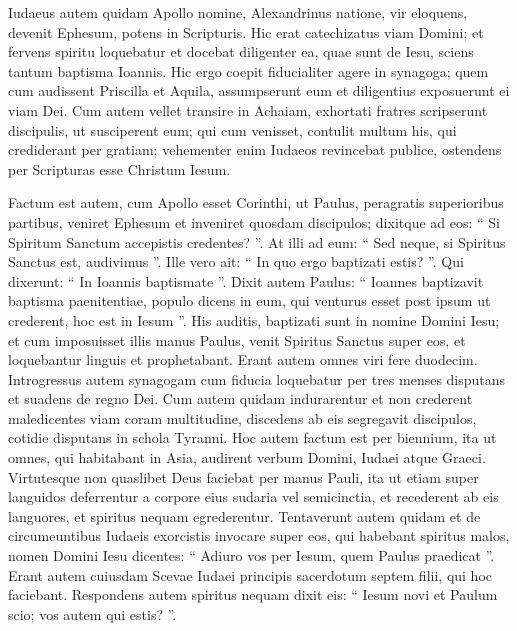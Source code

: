 \begin{biblechapter}
\begin{biblechapter}
\begin{biblechapter}
\begin{biblechapter}
\begin{biblechapter}
\begin{biblechapter}
\begin{biblechapter}
\begin{biblechapter}
\begin{biblechapter}
\begin{biblechapter}
\begin{biblechapter}
\begin{biblechapter}
\begin{biblechapter}
\begin{biblechapter}
\begin{biblechapter}
\begin{biblechapter}
\begin{biblechapter}
\begin{biblechapter}
 \verse Iudaeus autem quidam Apollo nomine, Alexandrinus natione, vir eloquens, devenit Ephesum, potens in Scripturis. 
\verse Hic erat catechizatus viam Domini; et fervens spiritu loquebatur et docebat diligenter ea, quae sunt de Iesu, sciens tantum baptisma Ioannis. 
\verse Hic ergo coepit fiducialiter agere in synagoga; quem cum audissent Priscilla et Aquila, assumpserunt eum et diligentius exposuerunt ei viam Dei. 
\verse Cum autem vellet transire in Achaiam, exhortati fratres scripserunt discipulis, ut susciperent eum; qui cum venisset, contulit multum his, qui crediderant per gratiam; 
\verse vehementer enim Iudaeos revincebat publice, ostendens per Scripturas esse Christum Iesum.
 
\begin{biblechapter}
\verse Factum est autem, cum Apollo esset Corinthi, ut Paulus, peragratis superioribus partibus, veniret Ephesum et inveniret quosdam discipulos; 
\verse dixitque ad eos: “ Si Spiritum Sanctum accepistis credentes? ”. At illi ad eum: “ Sed neque, si Spiritus Sanctus est, audivimus ”. 
\verse Ille vero ait: “ In quo ergo baptizati estis? ”. Qui dixerunt: “ In Ioannis baptismate ”. 
\verse Dixit autem Paulus: “ Ioannes baptizavit baptisma paenitentiae, populo dicens in eum, qui venturus esset post ipsum ut crederent, hoc est in Iesum ”. 
\verse His auditis, baptizati sunt in nomine Domini Iesu; 
\verse et cum imposuisset illis manus Paulus, venit Spiritus Sanctus super eos, et loquebantur linguis et prophetabant. 
\verse Erant autem omnes viri fere duodecim.
 \verse Introgressus autem synagogam cum fiducia loquebatur per tres menses disputans et suadens de regno Dei. 
\verse Cum autem quidam indurarentur et non crederent maledicentes viam coram multitudine, discedens ab eis segregavit discipulos, cotidie disputans in schola Tyranni. 
\verse Hoc autem factum est per biennium, ita ut omnes, qui habitabant in Asia, audirent verbum Domini, Iudaei atque Graeci.
 \verse Virtutesque non quaslibet Deus faciebat per manus Pauli, 
\verse ita ut etiam super languidos deferrentur a corpore eius sudaria vel semicinctia, et recederent ab eis languores, et spiritus nequam egrederentur.
 \verse Tentaverunt autem quidam et de circumeuntibus Iudaeis exorcistis invocare super eos, qui habebant spiritus malos, nomen Domini Iesu dicentes: “ Adiuro vos per Iesum, quem Paulus praedicat ”. 
\verse Erant autem cuiusdam Scevae Iudaei principis sacerdotum septem filii, qui hoc faciebant. 
\verse Respondens autem spiritus nequam dixit eis: “ Iesum novi et Paulum scio; vos autem qui estis? ”. 

\end{biblechapter}
\end{biblechapter}
\end{biblechapter}
\end{biblechapter}
\end{biblechapter}
\end{biblechapter}
\end{biblechapter}
\end{biblechapter}
\end{biblechapter}
\end{biblechapter}
\end{biblechapter}
\end{biblechapter}
\end{biblechapter}
\end{biblechapter}
\end{biblechapter}
\end{biblechapter}
\end{biblechapter}
\end{biblechapter}
\end{biblechapter}
